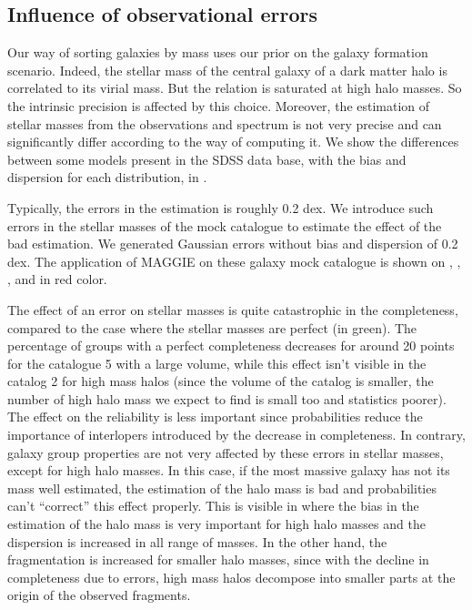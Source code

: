 \subsection{Influence of observational errors}
\label{sub:observational_errors}

Our way of sorting galaxies by mass uses our prior on the galaxy formation
scenario. Indeed, the stellar mass of the central galaxy of a dark matter halo
is correlated to its virial mass. But the relation is saturated at high halo
masses. So the intrinsic precision is affected by this choice. Moreover, the
estimation of stellar masses from the observations and spectrum is not very
precise and can significantly differ according to the way of computing it. We
show the differences between some models present in the SDSS data base, with
the bias and dispersion for each distribution, in .

Typically, the errors in the estimation is roughly 0.2 dex. We introduce such
errors in the stellar masses of the mock catalogue to estimate the effect of
the bad estimation. We generated Gaussian errors without bias and dispersion of
0.2 dex. The application of MAGGIE on these galaxy mock catalogue is shown on
, ,
,  and
 in red color.

The effect of an error on stellar masses is quite catastrophic in the
completeness, compared to the case where the stellar masses are perfect (in
green). The percentage of groups with a perfect completeness decreases for
around 20 points for the catalogue 5 with a large volume, while this effect
isn't visible in the catalog 2 for high mass halos (since the volume of the
catalog is smaller, the number of high halo mass we expect to find is small too
and statistics poorer). The effect on the reliability is less important since
probabilities reduce the importance of interlopers introduced by the decrease
in completeness. In contrary, galaxy group properties are not very affected by
these errors in stellar masses, except for high halo masses. In this case, if
the most massive galaxy has not its mass well estimated, the estimation of the
halo mass is bad and probabilities can't ``correct'' this effect properly. This
is visible in  where the bias in the
estimation of the halo mass is very important for high halo masses and the
dispersion is increased in all range of masses. In the other hand, the
fragmentation is increased for smaller halo masses, since with the decline in
completeness due to errors, high mass halos decompose into smaller parts at the
origin of the observed fragments.

